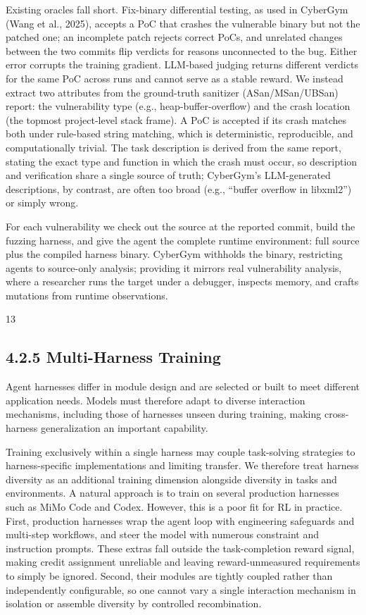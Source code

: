 \documentclass[
  10
]{article}
\begin{document}
Existing oracles fall short. Fix-binary differential testing, as used in
CyberGym (Wang et al., 2025), accepts a PoC that crashes the vulnerable
binary but not the patched one; an incomplete patch rejects correct
PoCs, and unrelated changes between the two commits flip verdicts for
reasons unconnected to the bug. Either error corrupts the training
gradient. LLM-based judging returns different verdicts for the same PoC
across runs and cannot serve as a stable reward. We instead extract two
attributes from the ground-truth sanitizer (ASan/MSan/UBSan) report: the
vulnerability type (e.g., heap-buffer-overflow) and the crash location
(the topmost project-level stack frame). A PoC is accepted if its crash
matches both under rule-based string matching, which is deterministic,
reproducible, and computationally trivial. The task description is
derived from the same report, stating the exact type and function in
which the crash must occur, so description and verification share a
single source of truth; CyberGym's LLM-generated descriptions, by
contrast, are often too broad (e.g., ``buffer overflow in libxml2'') or
simply wrong.

For each vulnerability we check out the source at the reported commit,
build the fuzzing harness, and give the agent the complete runtime
environment: full source plus the compiled harness binary. CyberGym
withholds the binary, restricting agents to source-only analysis;
providing it mirrors real vulnerability analysis, where a researcher
runs the target under a debugger, inspects memory, and crafts mutations
from runtime observations.

13

\subsection{4.2.5 Multi-Harness Training}\label{multi-harness-training}

Agent harnesses differ in module design and are selected or built to meet
different application needs. Models must therefore adapt to diverse
interaction mechanisms, including those of harnesses unseen during
training, making cross-harness generalization an important capability.

Training exclusively within a single harness may couple task-solving
strategies to harness-specific implementations and limiting transfer. We
therefore treat harness diversity as an additional training dimension
alongside diversity in tasks and environments. A natural approach is to
train on several production harnesses such as MiMo Code and Codex.
However, this is a poor fit for RL in practice. First, production
harnesses wrap the agent loop with engineering safeguards and multi-step
workflows, and steer the model with numerous constraint and instruction
prompts. These extras fall outside the task-completion reward signal,
making credit assignment unreliable and leaving reward-unmeasured
requirements to simply be ignored. Second, their modules are tightly
coupled rather than independently configurable, so one cannot vary a
single interaction mechanism in isolation or assemble diversity by
controlled recombination.
\end{document}
